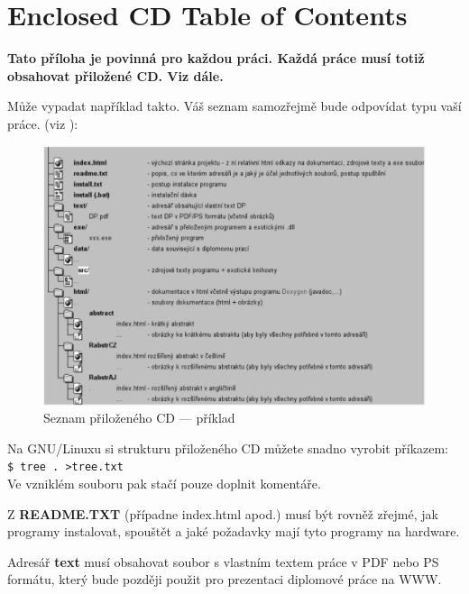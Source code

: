 \documentclass[11pt,twoside,a4paper]{book}
\begin{document}
\chapter{Enclosed CD Table of Contents}
\textbf{\large Tato příloha je povinná pro každou práci. Každá práce musí totiž obsahovat přiložené CD. Viz dále.}

Může vypadat například takto. Váš seznam samozřejmě bude odpovídat typu vaší práce. (viz \cite{infodp}):

\begin{figure}[h]
\begin{center}
\includegraphics[width=14cm]{figures/seznamcd}
\caption{Seznam přiloženého CD --- příklad}
\label{fig:seznamcd}
\end{center}
\end{figure}



Na GNU/Linuxu si strukturu přiloženého CD můžete snadno vyrobit příkazem:\\ 
\verb|$ tree . >tree.txt|\\
Ve vzniklém souboru pak stačí pouze doplnit komentáře.

Z \textbf{README.TXT} (případne index.html apod.)  musí být rovněž zřejmé, jak programy instalovat, spouštět a jaké požadavky mají tyto programy na hardware.

Adresář \textbf{text}  musí obsahovat soubor s vlastním textem práce v PDF nebo PS formátu, který bude později použit pro prezentaci diplomové práce na WWW.
\end{document}
